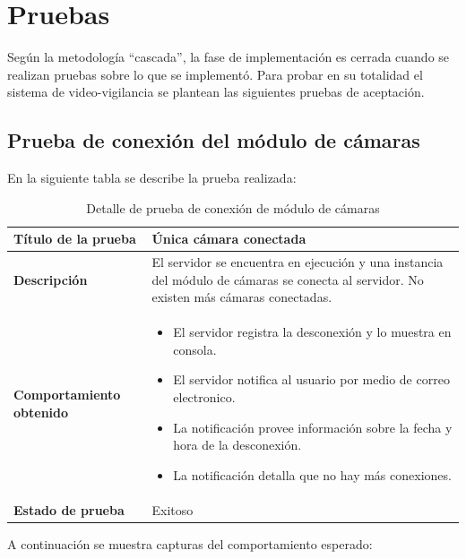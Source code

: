 \chapter{Pruebas}

Según la metodología ``cascada'', la fase de implementación es cerrada cuando se realizan pruebas sobre lo que se implementó. Para probar en su totalidad el sistema de video-vigilancia se plantean las siguientes pruebas de aceptación.\\

\section{Prueba de conexión del módulo de cámaras}
En la siguiente tabla se describe la prueba realizada:

\begin{table}[H]
    \caption{Detalle de prueba de conexión de módulo de cámaras}
    \begin{center}
        \begin{tabular}{|>{\centering}p{}|m{}<{\centering}|} 
            \hline
            \textbf{Título de la prueba} & Única cámara conectada \\
            \hline
            \textbf{Descripción} & El servidor se encuentra en ejecución y una instancia del módulo de cámaras se conecta al servidor. No existen más cámaras conectadas.\\
            \hline
            \textbf{Comportamiento obtenido} & 
            \begin{itemize}
                \item El servidor registra la desconexión y lo muestra en consola.
                \item El servidor notifica al usuario por medio de correo electronico.
                \item La notificación provee información sobre la fecha y hora de la desconexión.
                \item La notificación detalla que no hay más conexiones.
            \end{itemize} \\ 
            \hline
            \textbf{Estado de prueba} & Exitoso \\
            \hline
        \end{tabular}
    \end{center}
\end{table}

A continuación se muestra capturas del comportamiento esperado:\\

